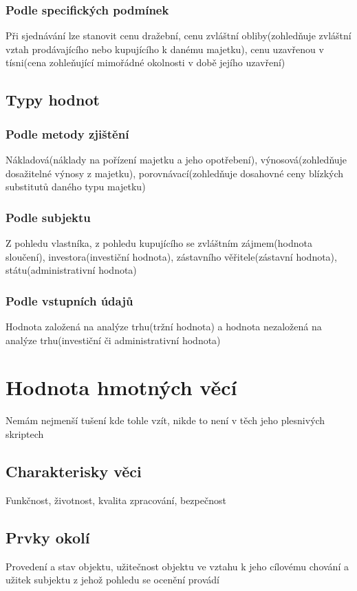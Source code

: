 \subsubsection*{Podle specifických podmínek}
Při sjednávání lze stanovit cenu dražební, cenu zvláštní obliby(zohledňuje zvláštní vztah prodávajícího nebo kupujícího k danému majetku), cenu uzavřenou
v tísni(cena zohleňující mimořádné okolnosti v době jejího uzavření)

\subsection{Typy hodnot}
\subsubsection*{Podle metody zjištění}
Nákladová(náklady na pořízení majetku a jeho opotřebení), výnosová(zohledňuje dosažitelné výnosy z majetku), porovnávací(zohledňuje dosahovné ceny blízkých
substitutů daného typu majetku)
\subsubsection*{Podle subjektu}
Z pohledu vlastníka, z pohledu kupujícího se zvláštním zájmem(hodnota sloučení), investora(investiční hodnota), zástavního věřitele(zástavní hodnota), státu(administrativní hodnota)
\subsubsection*{Podle vstupních údajů}
Hodnota založená na analýze trhu(tržní hodnota) a hodnota nezaložená na analýze trhu(investiční či administrativní hodnota)

\section{Hodnota hmotných věcí}
Nemám nejmenší tušení kde tohle vzít, nikde to není v těch jeho plesnivých skriptech
\subsection{Charakterisky věci}
Funkčnost, životnost, kvalita zpracování, bezpečnost
\subsection{Prvky okolí}
Provedení a stav objektu, užitečnost objektu ve vztahu k jeho cílovému chování a užitek subjektu z jehož pohledu se ocenění provádí

